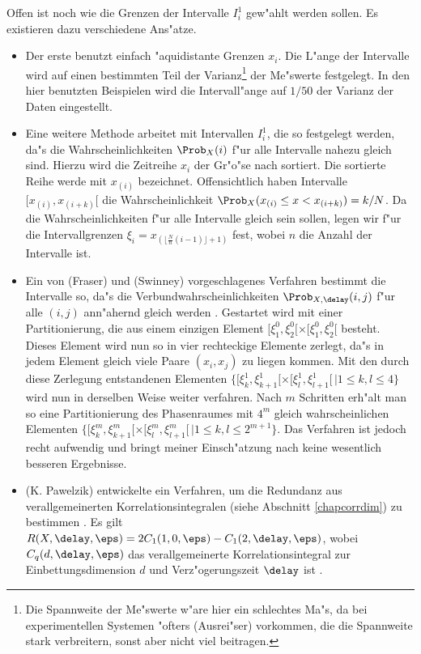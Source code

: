 Offen ist noch wie die Grenzen der Intervalle $I^1_i$ gew"ahlt werden sollen. Es
existieren dazu verschiedene Ans"atze.
\begin{itemize}
\item Der erste benutzt einfach "aquidistante Grenzen $x_i$. Die L"ange der Intervalle
  wird auf einen bestimmten Teil der Varianz\footnote{Die Spannweite der Me"swerte w"are
    hier ein schlechtes Ma"s, da bei experimentellen Systemen "ofters \slang(Ausrei"ser)
    vorkommen, die die Spannweite stark verbreitern, sonst aber nicht viel beitragen.} der
  Me"swerte festgelegt. In den hier benutzten Beispielen wird die Intervall"ange auf
  $1/50$ der Varianz der Daten eingestellt.
\item Eine weitere Methode arbeitet mit Intervallen $I^1_i$, die so festgelegt werden,
  da"s die Wahrscheinlichkeiten $\Prob_X(i)$ f"ur alle Intervalle nahezu gleich sind.
  Hierzu wird die Zeitreihe $x_i$ der Gr"o"se nach sortiert. Die sortierte Reihe werde mit
  $x_{(i)}$ bezeichnet.  Offensichtlich haben Intervalle $[x_{(i)},x_{(i+k)}[$ die
  Wahrscheinlichkeit $\Prob_X(x_{(i)}\leq x<x_{(i+k)})=k/N$. Da die Wahrscheinlichkeiten
  f"ur alle Intervalle gleich sein sollen, legen wir f"ur die Intervallgrenzen
  $\xi_i=x_{(\lfloor\frac{N}{n}(i-1)\rfloor+1)}$ fest, wobei $n$ die Anzahl der Intervalle
  ist.
\item Ein von \autor(Fraser) und \autor(Swinney) vorgeschlagenes Verfahren bestimmt die
  Intervalle so, da"s die Verbundwahrscheinlichkeiten $\Prob_{X,\delay}(i,j)$ f"ur alle
  $(i,j)$ ann"ahernd gleich werden \cite{Fraser-swinney}. Gestartet wird mit einer
  Partitionierung, die aus einem einzigen Element
  $[\xi^0_1,\xi^0_2[\times[\xi^0_1,\xi^0_2[$ besteht. Dieses Element wird nun so in vier
  rechteckige Elemente zerlegt, da"s in jedem Element gleich viele Paare $(x_i,x_j)$ zu
  liegen kommen. Mit den durch diese Zerlegung entstandenen Elementen $\{
  [\xi^1_k,\xi^1_{k+1} [ \times [\xi^1_l, \xi^1_{l+1} [ \, \vert 1 \leq k , l \leq 4\}$
  wird nun in derselben Weise weiter verfahren. Nach $m$ Schritten erh"alt man so eine
  Partitionierung des Phasenraumes mit $4^m$ gleich wahrscheinlichen Elementen
  $\{[\xi^m_k,\xi^m_{k+1}[\times[\xi^m_l,\xi^m_{l+1}[\,\vert 1\leq k,l \leq 2^{m+1}\}$.
  Das Verfahren ist jedoch recht aufwendig und bringt meiner Einsch"atzung nach keine
  wesentlich besseren Ergebnisse.
\item \autor(K. Pawelzik) entwickelte ein Verfahren, um die Redundanz aus
  verallgemeinerten Korrelationsintegralen (siehe Abschnitt \ref{chapcorrdim}) zu bestimmen \cite{Pawelzik91}.
  Es gilt $R(X,\delay,\eps)=2C_1(1,0,\eps)-C_1(2,\delay,\eps)$, wobei $C_q(d,\delay,\eps)$
  das verallgemeinerte Korrelationsintegral zur Einbettungsdimension $d$ und 
  Verz"ogerungszeit $\delay$ ist \cite{Pawelzik-schuster}.
\end{itemize}


